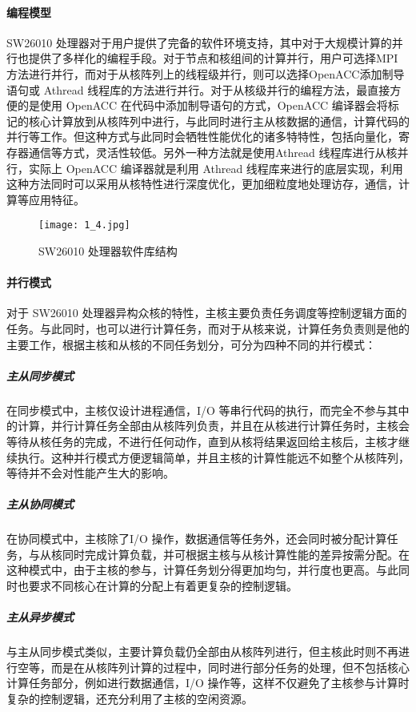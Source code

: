 \paragraph{编程模型}
SW26010 处理器对于用户提供了完备的软件环境支持，其中对于大规模计算的并行也提供了多样化的编程手段。对于节点和核组间的计算并行，用户可选择MPI 方法进行并行，而对于从核阵列上的线程级并行，则可以选择OpenACC添加制导语句或 Athread 线程库的方法进行并行。对于从核级并行的编程方法，最直接方便的是使用 OpenACC 在代码中添加制导语句的方式，OpenACC 编译器会将标记的核心计算放到从核阵列中进行，与此同时进行主从核数据的通信，计算代码的并行等工作。但这种方式与此同时会牺牲性能优化的诸多特特性，包括向量化，寄存器通信等方式，灵活性较低。另外一种方法就是使用Athread 线程库进行从核并行，实际上 OpenACC 编译器就是利用 Athread 线程库来进行的底层实现，利用这种方法同时可以采用从核特性进行深度优化，更加细粒度地处理访存，通信，计算等应用特征。

 \begin{figure}[h]
  \centering
  \texttt{[image: 1\_4.jpg]}
  \caption{SW26010 处理器软件库结构}
\end{figure}

\paragraph{并行模式}
对于 SW26010 处理器异构众核的特性，主核主要负责任务调度等控制逻辑方面的任务。与此同时，也可以进行计算任务，而对于从核来说，计算任务负责则是他的主要工作，根据主核和从核的不同任务划分，可分为四种不同的并行模式：
\subparagraph{主从同步模式}
在同步模式中，主核仅设计进程通信，I/O 等串行代码的执行，而完全不参与其中的计算，并行计算任务全部由从核阵列负责，并且在从核进行计算任务时，主核会等待从核任务的完成，不进行任何动作，直到从核将结果返回给主核后，主核才继续执行。这种并行模式方便逻辑简单，并且主核的计算性能远不如整个从核阵列，等待并不会对性能产生大的影响。

\subparagraph{主从协同模式}
在协同模式中，主核除了I/O 操作，数据通信等任务外，还会同时被分配计算任务，与从核同时完成计算负载，并可根据主核与从核计算性能的差异按需分配。在这种模式中，由于主核的参与，计算任务划分得更加均匀，并行度也更高。与此同时也要求不同核心在计算的分配上有着更复杂的控制逻辑。

\subparagraph{主从异步模式}
与主从同步模式类似，主要计算负载仍全部由从核阵列进行，但主核此时则不再进行空等，而是在从核阵列计算的过程中，同时进行部分任务的处理，但不包括核心计算任务部分，例如进行数据通信，I/O 操作等，这样不仅避免了主核参与计算时复杂的控制逻辑，还充分利用了主核的空闲资源。

